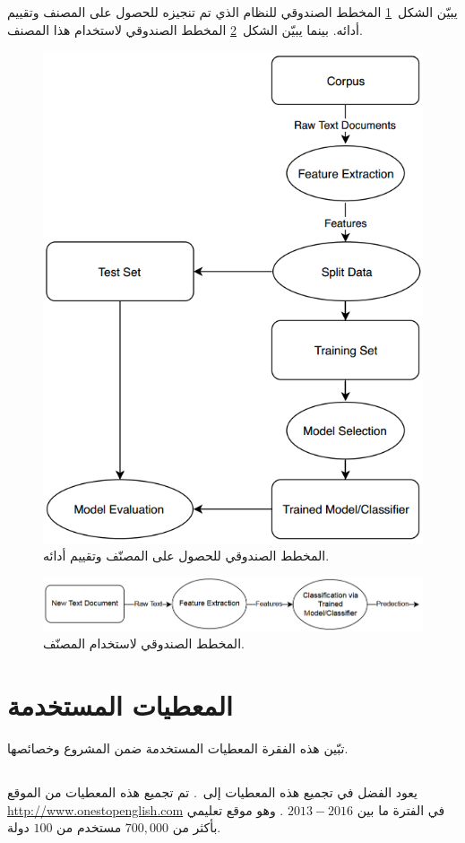 يبيّن الشكل~\ref{fig:sys:diag} المخطط الصندوقي للنظام الذي تم تنجيزه للحصول على المصنف وتقييم أدائه.
بينما يبيّن الشكل~\ref{fig:sys:use} المخطط الصندوقي لاستخدام هذا المصنف.
 \begin{figure}[htb] 
	\centering
	\includegraphics[width=0.65\linewidth]{images/sys_diag.png}
	\caption{%
		المخطط الصندوقي للحصول على المصنّف وتقييم أدائه.
	}
	\label{fig:sys:diag}
\end{figure}

 \begin{figure}[htb] 
	\centering
	\includegraphics[width=0.9\linewidth]{images/sys_use.png}
	\caption{%
		المخطط الصندوقي لاستخدام المصنّف.
	}
	\label{fig:sys:use}
\end{figure}

\afterpage{\clearpage}

\section{المعطيات المستخدمة}
\label{sec:sys:datasets}
تبّين هذه الفقرة المعطيات المستخدمة ضمن المشروع وخصائصها.


\subsection{}
يعود الفضل في تجميع هذه المعطيات إلى~\cite{vajjala2018}.
تم تجميع هذه المعطيات من الموقع
\url{http://www.onestopenglish.com}
في الفترة ما بين
$2013-2016$%
. وهو موقع تعليمي بأكثر من $700,000$ مستخدم  من $100$ دولة.

